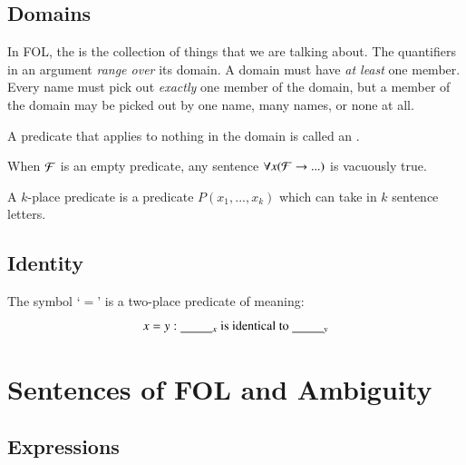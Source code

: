 \documentclass[12pt, a4paper, oneside, openright, titlepage]{book}
\begin{document}
\section{\textsection Domains}

\begin{defn}
    In FOL, the  is the collection of things that we are talking about. The quantifiers in an argument \emph{range over} its domain. A domain must have \emph{at least} one member. Every name must pick out \emph{exactly} one member of the domain, but a member of the domain may be picked out by one name, many names, or none at all.
\end{defn}

\begin{defn}
    A predicate that applies to nothing in the domain is called an .
\end{defn}

\begin{rmk}
    When $\mathcal{F}$ is an empty predicate, any sentence $\forall x(\mathcal{F}\rightarrow...)$ is vacuously true.
\end{rmk}

\begin{defn}
    A $k$-place predicate is a predicate $P(x_1,...,x_k)$ which can take in $k$ sentence letters.
\end{defn}

\section{\textsection Identity}

\begin{defn}
    The symbol `$=$' is a two-place predicate of meaning: \begin{equation*}
        x=y: \text{\underline{\hspace*{2.5em}}$_{x}$ is identical to \underline{\hspace*{2.5em}}$_{y}$}
    \end{equation*}
\end{defn}


\chapter{\textsection\textsection Sentences of FOL and Ambiguity}

\section{\textsection Expressions}
\end{document}
